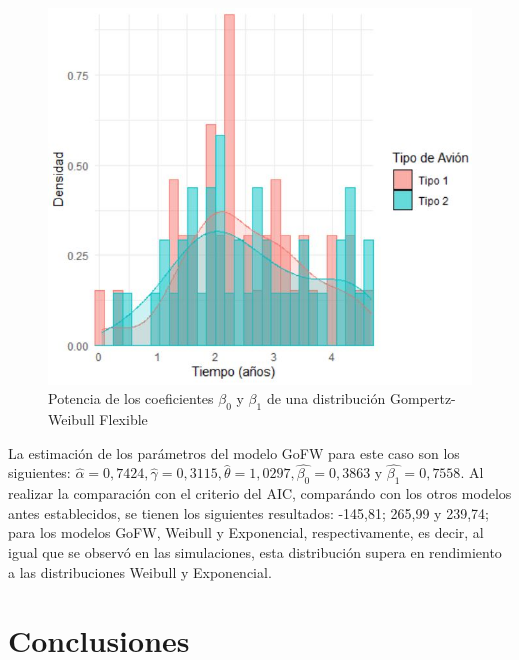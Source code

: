\documentclass[12pt,a4paper]{article}
\begin{document}
\begin{figure}[h!]
\begin{center}
\includegraphics[scale=0.68]{avion.JPG} 
\caption{Potencia de los coeficientes $\beta_0$ y $\beta_1$ de una distribución Gompertz-Weibull Flexible}
\end{center}
\end{figure}

La estimación de los parámetros del modelo GoFW para este caso son los siguientes: $\hat{\alpha} = 0,7424 , \hat{\gamma}=0,3115, \hat{\theta}=1,0297, \hat{\beta_0}=0,3863$ y  $\hat{\beta_1}=0,7558$. Al realizar la comparación con el criterio del AIC, comparándo con los otros modelos antes establecidos, se tienen los siguientes resultados: -145,81; 265,99 y 239,74; para los modelos GoFW, Weibull y Exponencial, respectivamente, es decir, al igual que se observó en las simulaciones, esta distribución supera en rendimiento a las distribuciones Weibull y Exponencial. 


\section{Conclusiones}
\end{document}

